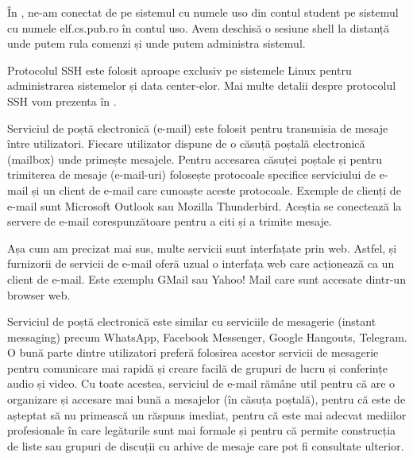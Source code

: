 
În , ne-am conectat de pe sistemul cu numele uso din contul student pe sistemul cu numele elf.cs.pub.ro în contul uso. Avem deschisă o sesiune shell la distanță unde putem rula comenzi și unde putem administra sistemul.

Protocolul SSH este folosit aproape exclusiv pe sistemele Linux pentru administrarea sistemelor și data center-elor. Mai multe detalii despre protocolul SSH vom prezenta în .

Serviciul de poștă electronică (e-mail) este folosit pentru transmisia de mesaje între utilizatori. Fiecare utilizator dispune de o căsuță poștală electronică (mailbox) unde primește mesajele. Pentru accesarea căsuței poștale și pentru trimiterea de mesaje (e-mail-uri) folosește protocoale specifice serviciului de e-mail și un client de e-mail care cunoaște aceste protocoale. Exemple de clienți de e-mail sunt Microsoft Outlook sau Mozilla Thunderbird. Aceștia se conectează la servere de e-mail corespunzătoare pentru a citi și a trimite mesaje.

Așa cum am precizat mai sus, multe servicii sunt interfațate prin web. Astfel, și furnizorii de servicii de e-mail oferă uzual o interfața web care acționează ca un client de e-mail. Este exemplu GMail sau Yahoo! Mail care sunt accesate dintr-un browser web.

Serviciul de poștă electronică este similar cu serviciile de mesagerie (instant messaging) precum WhatsApp, Facebook Messenger, Google Hangouts, Telegram. O bună parte dintre utilizatori preferă folosirea acestor servicii de mesagerie pentru comunicare mai rapidă și creare facilă de grupuri de lucru și conferințe audio și video. Cu toate acestea, serviciul de e-mail rămâne util pentru că are o organizare și accesare mai bună a mesajelor (în căsuța poștală), pentru că este de așteptat să nu primească un răspuns imediat, pentru că este mai adecvat mediilor profesionale în care legăturile sunt mai formale și pentru că permite construcția de liste sau grupuri de discuții cu arhive de mesaje care pot fi consultate ulterior.

